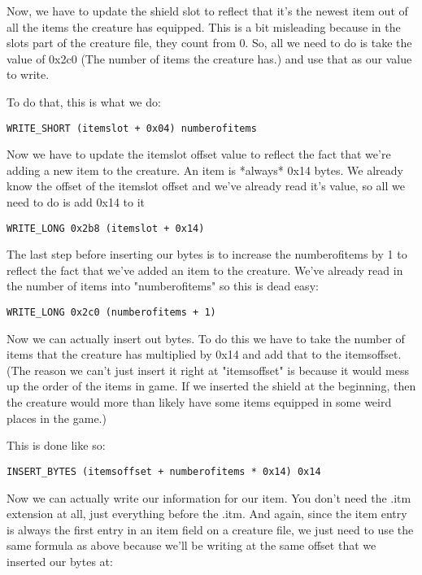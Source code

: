 \documentclass{article}
\begin{document}
Now, we have to update the shield slot to reflect that it's the newest item
out of all the items the creature has equipped.  This is a bit misleading
because in the slots part of the creature file, they count from 0.  So, all
we need to do is take the value of 0x2c0 (The number of items the creature
has.) and use that as our value to write.

To do that, this is what we do:

\begin{verbatim}
WRITE_SHORT (itemslot + 0x04) numberofitems
\end{verbatim}

Now we have to update the itemslot offset value to reflect the fact that
we're adding a new item to the creature.  An item is *always* 0x14 bytes.
We already know the offset of the itemslot offset and we've already read
it's value, so all we need to do is add 0x14 to it

\begin{verbatim}
WRITE_LONG 0x2b8 (itemslot + 0x14)
\end{verbatim}

The last step before inserting our bytes is to increase the numberofitems by 1 to
reflect the fact that we've added an item to the creature.  We've already
read in the number of items into "numberofitems" so this is dead easy:

\begin{verbatim}
WRITE_LONG 0x2c0 (numberofitems + 1)
\end{verbatim}

Now we can actually insert out bytes.  To do this we have to take the
number of items that the creature has multiplied by 0x14 and add that to
the itemsoffset.  (The reason we can't just insert it right at
"itemsoffset" is because it would mess up the order of the items in game.
If we inserted the shield at the beginning, then the creature would more
than likely have some items equipped in some weird places in the game.)

This is done like so:

\begin{verbatim}
INSERT_BYTES (itemsoffset + numberofitems * 0x14) 0x14
\end{verbatim}

Now we can actually write our information for our item.  You don't need the
.itm extension at all, just everything before the .itm.  And again, since
the item entry is always the first entry in an item field on a creature
file, we just need to use the same formula as above because we'll be
writing at the same offset that we inserted our bytes at:
\end{document}
